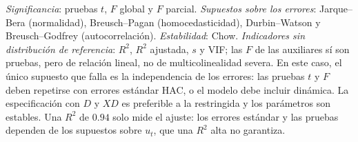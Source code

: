 \begin{solucion}
\emph{Significancia}: pruebas $t$, $F$ global y $F$ parcial. \emph{Supuestos sobre los errores}: Jarque--Bera (normalidad), Breusch--Pagan (homocedasticidad), Durbin--Watson y Breusch--Godfrey (autocorrelación). \emph{Estabilidad}: Chow. \emph{Indicadores sin distribución de referencia}: $R^2$, $R^2$ ajustada, $s$ y VIF; las $F$ de las auxiliares sí son pruebas, pero de relación lineal, no de multicolinealidad severa. En este caso, el único supuesto que falla es la independencia de los errores: las pruebas $t$ y $F$ deben repetirse con errores estándar HAC, o el modelo debe incluir dinámica. La especificación con $D$ y $XD$ es preferible a la restringida y los parámetros son estables. Una $R^2$ de $0.94$ solo mide el ajuste: los errores estándar y las pruebas dependen de los supuestos sobre $u_t$, que una $R^2$ alta no garantiza.
\end{solucion}
